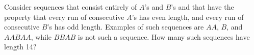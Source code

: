 Consider sequences that consist entirely of $ A$'s and $ B$'s and that have the property that every run of consecutive $ A$'s has even length, and every run of consecutive $ B$'s has odd length. Examples of such sequences are $ AA$, $ B$, and $ AABAA$, while $ BBAB$ is not such a sequence. How many such sequences have length 14?